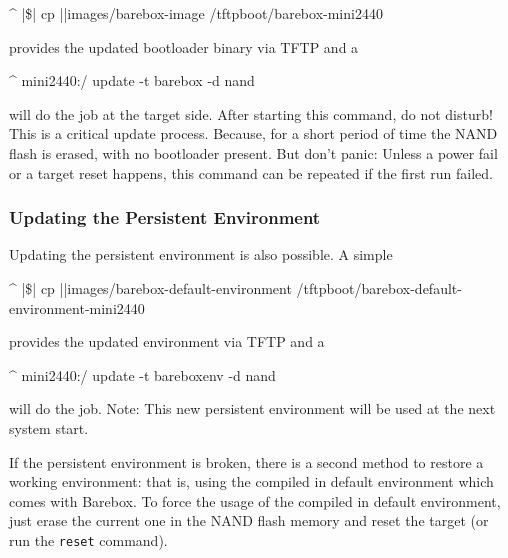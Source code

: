 \begin{ptxshell}[escapechar=|]{^}
|\$| cp |\ptxdistPlatformDir |images/barebox-image /tftpboot/barebox-mini2440
\end{ptxshell}

provides the updated bootloader binary via TFTP and a

\begin{ptxshell}[escapechar=|]{^}
mini2440:/ update -t barebox -d nand
\end{ptxshell}

will do the job at the target side. After starting this command, do not disturb!
This is a critical update process. Because, for a short period of time the
NAND flash is erased, with no bootloader present. But don't panic: Unless a
power fail or a target reset happens, this command can be repeated if the
first run failed.

\subsubsection{Updating the Persistent Environment}


Updating the persistent environment is also possible. A simple

\begin{ptxshell}[escapechar=|]{^}
|\$| cp |\ptxdistPlatformDir |images/barebox-default-environment /tftpboot/barebox-default-environment-mini2440
\end{ptxshell}

provides the updated environment via TFTP and a

\begin{ptxshell}[escapechar=|]{^}
mini2440:/ update -t bareboxenv -d nand
\end{ptxshell}

will do the job. Note: This new persistent environment will be used at the next
system start.

If the persistent environment is broken, there is a second method to restore a
working environment: that is, using the compiled in default environment which
comes with Barebox.
To force the usage of the compiled in default environment, just erase the
current one in the NAND flash memory and reset the target (or run the
\texttt{reset} command).

